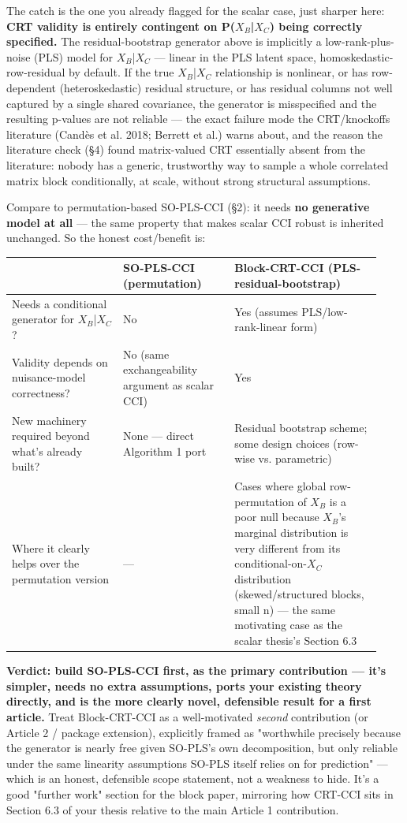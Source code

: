 \documentclass[11pt,a4paper]{article}
\begin{document}
	The catch is the one you already flagged for the scalar case, just sharper here: \textbf{CRT validity is entirely contingent on P(\(X_B\)|\(X_C\)) being correctly specified.} The residual-bootstrap generator above is implicitly a low-rank-plus-noise (PLS) model for \(X_B\)|\(X_C\) — linear in the PLS latent space, homoskedastic-row-residual by default. If the true \(X_B\)|\(X_C\) relationship is nonlinear, or has row-dependent (heteroskedastic) residual structure, or has residual columns not well captured by a single shared covariance, the generator is misspecified and the resulting p-values are not reliable — the exact failure mode the CRT/knockoffs literature (Candès et al. 2018; Berrett et al.) warns about, and the reason the literature check (\S{}4) found matrix-valued CRT essentially absent from the literature: nobody has a generic, trustworthy way to sample a whole correlated matrix block conditionally, at scale, without strong structural assumptions.
	
	Compare to permutation-based SO-PLS-CCI (\S{}2): it needs \textbf{no generative model at all} — the same property that makes scalar CCI robust is inherited unchanged. So the honest cost/benefit is:
	
	\begingroup\small\setlength{\tabcolsep}{5pt}
	\begin{longtable}{@{}p{0.28\linewidth}p{0.28\linewidth}p{0.37\linewidth}@{}}\toprule
		& SO-PLS-CCI (permutation) & Block-CRT-CCI (PLS-residual-bootstrap) \\
		\midrule\endhead
		Needs a conditional generator for \(X_B\)|\(X_C\)? & No & Yes (assumes PLS/low-rank-linear form) \\
		Validity depends on nuisance-model correctness? & No (same exchangeability argument as scalar CCI) & Yes \\
		New machinery required beyond what's already built? & None — direct Algorithm 1 port & Residual bootstrap scheme; some design choices (row-wise vs. parametric) \\
		Where it clearly helps over the permutation version & — & Cases where global row-permutation of \(X_B\) is a poor null because \(X_B\)'s marginal distribution is very different from its conditional-on-\(X_C\) distribution (skewed/structured blocks, small n) — the same motivating case as the scalar thesis's Section 6.3 \\
		\bottomrule\end{longtable}
	\endgroup
	
	\textbf{Verdict: build SO-PLS-CCI first, as the primary contribution — it's simpler, needs no extra assumptions, ports your existing theory directly, and is the more clearly novel, defensible result for a first article.} Treat Block-CRT-CCI as a well-motivated \emph{second} contribution (or Article 2 / package extension), explicitly framed as "worthwhile precisely because the generator is nearly free given SO-PLS's own decomposition, but only reliable under the same linearity assumptions SO-PLS itself relies on for prediction" — which is an honest, defensible scope statement, not a weakness to hide. It's a good "further work" section for the block paper, mirroring how CRT-CCI sits in Section 6.3 of your thesis relative to the main Article 1 contribution.
	
\end{document}
